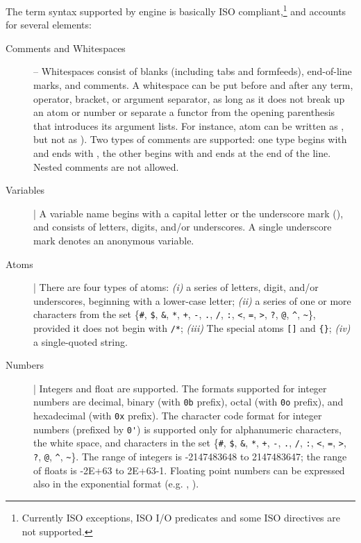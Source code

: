 \noindent The term syntax supported by \tuprolog{} engine is basically ISO compliant,\footnote{Currently ISO exceptions, ISO I/O predicates and some ISO directives are not supported.}
and accounts for several elements:
%
\begin{description}
\item[Comments and Whitespaces] -- Whitespaces consist of blanks (including tabs and formfeeds), end-of-line marks, and comments. A whitespace can be put before and after any term, operator, bracket, or argument separator, as long as it does not break up an atom or number or separate a functor from the opening parenthesis that introduces its argument lists.
%
For instance, atom  can be written as , but not as ).
%
Two types of comments are supported: one type begins with \bt{/*} and ends with \bt{*/}, the other begins with \bt{\%} and ends at the end of the line.
%
Nested comments are not allowed.
%
\item[Variables] |
A variable name begins with a capital
letter or the underscore mark (\bt{\_}), and consists of letters,
digits, and/or underscores.
%
A single underscore mark denotes an anonymous variable.
%
\item[Atoms] |
There are four types of atoms:
\emph{(i)} a series of letters, digit, and/or underscores, beginning with a lower-case letter; \emph{(ii)} a series of one or more characters from the set \{\texttt{\#}, \texttt{\$}, \texttt{\&}, \texttt{*}, \texttt{+}, \texttt{-}, \texttt{.}, \texttt{/}, \texttt{:}, \texttt{<}, \texttt{=}, \texttt{>}, \texttt{?}, \texttt{@}, \texttt{\textasciicircum}, \texttt{\~}\}, provided it does not begin with \texttt{/*};
\emph{(iii)} The special atoms \texttt{[]} and \texttt{\{\}};
\emph{(iv)} a single-quoted string.
%
\item[Numbers] |
Integers and float are supported.
%
The formats supported for integer numbers are decimal, binary (with \verb|0b|
prefix), octal (with \verb|0o| prefix), and hexadecimal (with \verb|0x|
prefix). The character code format for integer numbers (prefixed by \verb|0'|) is supported only for alphanumeric characters, the white space, and characters in the set \{\texttt{\#}, \texttt{\$}, \texttt{\&}, \texttt{*}, \texttt{+}, \texttt{-}, \texttt{.}, \texttt{/}, \texttt{:}, \texttt{<}, \texttt{=}, \texttt{>}, \texttt{?}, \texttt{@}, \texttt{\textasciicircum}, \texttt{\~}\}.
%
The range of integers is -2147483648 to 2147483647; the range of floats is
-2E+63 to 2E+63-1.
%
Floating point numbers can be expressed also in the exponential format (e.g. , ).

\end{description}

